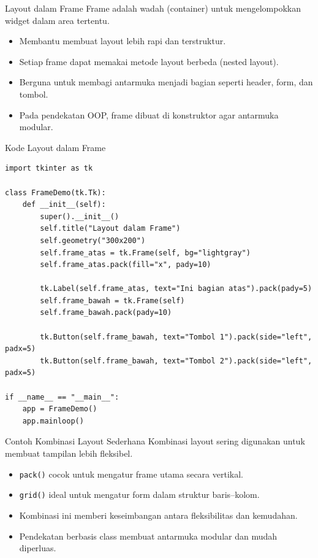 \documentclass[aspectratio=169, table]{beamer}
\begin{document}
\begin{frame}[fragile]{Layout dalam Frame}
\vspace{20pt}
Frame adalah wadah (container) untuk mengelompokkan widget dalam area tertentu.

\begin{itemize}
    \item Membantu membuat layout lebih rapi dan terstruktur.
    \item Setiap frame dapat memakai metode layout berbeda (nested layout).
    \item Berguna untuk membagi antarmuka menjadi bagian seperti header, form, dan tombol.
    \item Pada pendekatan OOP, frame dibuat di konstruktor agar antarmuka modular.
\end{itemize}
\end{frame}

\begin{frame}[fragile]{Kode Layout dalam Frame}
\vspace{20pt}
\begin{lstlisting}[style=PythonStyle, basicstyle=\ttfamily\scriptsize]
import tkinter as tk

class FrameDemo(tk.Tk):
    def __init__(self):
        super().__init__()
        self.title("Layout dalam Frame")
        self.geometry("300x200")
        self.frame_atas = tk.Frame(self, bg="lightgray")
        self.frame_atas.pack(fill="x", pady=10)

        tk.Label(self.frame_atas, text="Ini bagian atas").pack(pady=5)
        self.frame_bawah = tk.Frame(self)
        self.frame_bawah.pack(pady=10)

        tk.Button(self.frame_bawah, text="Tombol 1").pack(side="left", padx=5)
        tk.Button(self.frame_bawah, text="Tombol 2").pack(side="left", padx=5)

if __name__ == "__main__":
    app = FrameDemo()
    app.mainloop()
\end{lstlisting}
\end{frame}


\begin{frame}[fragile]{Contoh Kombinasi Layout Sederhana}
\vspace{20pt}
Kombinasi layout sering digunakan untuk membuat tampilan lebih fleksibel.

\begin{itemize}
    \item \texttt{pack()} cocok untuk mengatur frame utama secara vertikal.
    \item \texttt{grid()} ideal untuk mengatur form dalam struktur baris–kolom.
    \item Kombinasi ini memberi keseimbangan antara fleksibilitas dan kemudahan.
    \item Pendekatan berbasis class membuat antarmuka modular dan mudah diperluas.
\end{itemize}
\end{frame}
\end{document}
